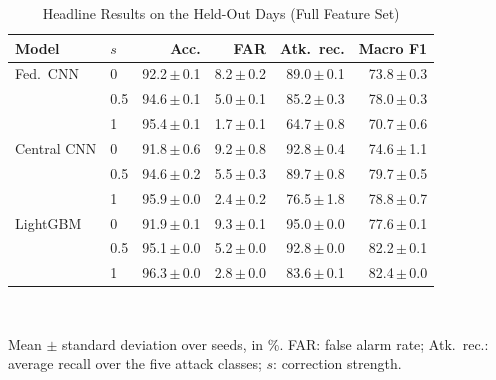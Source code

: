 \begin{table}[t]
\centering
\scriptsize
\caption{Headline Results on the Held-Out Days (Full Feature Set)}
\label{tab:headline}
\setlength{\tabcolsep}{2.5pt}
\begin{tabular}{llrrrr}
\toprule
Model & $s$ & Acc. & FAR & Atk.\ rec. & Macro F1 \\
\midrule
Fed.\ CNN & 0 & 92.2{\,}$\pm${\,}0.1 & 8.2{\,}$\pm${\,}0.2 & 89.0{\,}$\pm${\,}0.1 & 73.8{\,}$\pm${\,}0.3 \\
 & 0.5 & 94.6{\,}$\pm${\,}0.1 & 5.0{\,}$\pm${\,}0.1 & 85.2{\,}$\pm${\,}0.3 & 78.0{\,}$\pm${\,}0.3 \\
 & 1 & 95.4{\,}$\pm${\,}0.1 & 1.7{\,}$\pm${\,}0.1 & 64.7{\,}$\pm${\,}0.8 & 70.7{\,}$\pm${\,}0.6 \\
\midrule
Central CNN & 0 & 91.8{\,}$\pm${\,}0.6 & 9.2{\,}$\pm${\,}0.8 & 92.8{\,}$\pm${\,}0.4 & 74.6{\,}$\pm${\,}1.1 \\
 & 0.5 & 94.6{\,}$\pm${\,}0.2 & 5.5{\,}$\pm${\,}0.3 & 89.7{\,}$\pm${\,}0.8 & 79.7{\,}$\pm${\,}0.5 \\
 & 1 & 95.9{\,}$\pm${\,}0.0 & 2.4{\,}$\pm${\,}0.2 & 76.5{\,}$\pm${\,}1.8 & 78.8{\,}$\pm${\,}0.7 \\
\midrule
LightGBM & 0 & 91.9{\,}$\pm${\,}0.1 & 9.3{\,}$\pm${\,}0.1 & 95.0{\,}$\pm${\,}0.0 & 77.6{\,}$\pm${\,}0.1 \\
 & 0.5 & 95.1{\,}$\pm${\,}0.0 & 5.2{\,}$\pm${\,}0.0 & 92.8{\,}$\pm${\,}0.0 & 82.2{\,}$\pm${\,}0.1 \\
 & 1 & 96.3{\,}$\pm${\,}0.0 & 2.8{\,}$\pm${\,}0.0 & 83.6{\,}$\pm${\,}0.1 & 82.4{\,}$\pm${\,}0.0 \\
\bottomrule
\end{tabular}
\\[2pt]
\parbox{\linewidth}{\scriptsize Mean $\pm$ standard deviation over  seeds, in \%. FAR: false alarm rate; Atk.\ rec.: average recall over the five attack classes; $s$: correction strength.}
\end{table}

